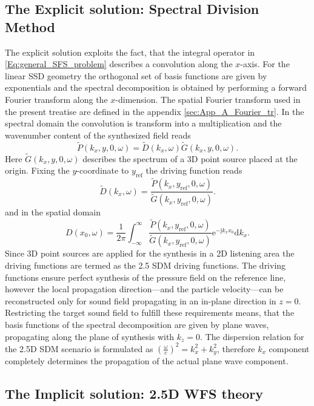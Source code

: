 \documentclass[journal]{IEEEtran}
\newcommand{\td}{\mathrm{d}}
\newcommand{\te}{\mathrm{e}}
\newcommand{\ti}{\mathrm{j}}
\newcommand{\yref}{y_{\mathrm{ref}}}
\begin{document}
\subsection{The Explicit solution: Spectral Division Method}

The explicit solution exploits the fact, that the integral operator in \eqref{Eq:general_SFS_problem} describes a convolution along the $x$-axis. 
For the linear SSD geometry the orthogonal set of basis functions are given by exponentials and the spectral decomposition is obtained by performing a forward Fourier transform along the $x$-dimension.
The spatial Fourier transform used in the present treatise are defined in the appendix \ref{sec:App_A_Fourier_tr}. 
In the spectral domain the convolution is transform into a multiplication and the wavenumber content of the synthesized field reads
\begin{equation}
\tilde{P}(k_x, y, 0, \omega) = \tilde{D}(k_x, \omega) \tilde{G}(k_x, y, 0,\omega).
\end{equation}
Here $\tilde{G}(k_x,y,0,\omega)$ describes the spectrum of a 3D point source placed at the origin.
Fixing the $y$-coordinate to $\yref$ the driving function reads
\begin{equation}
\tilde{D}(k_x,\omega) = \frac{\tilde{P}(k_x, \yref, 0, \omega)}{\tilde{G}(k_x, \yref, 0,\omega)}.
\end{equation}
and in the spatial domain
\begin{equation}
D(x_0,\omega) = \frac{1}{2\pi} \int_{-\infty}^{\infty} \frac{\tilde{P}(k_x, \yref, 0, \omega)}{\tilde{G}(k_x, \yref, 0,\omega)} \te^{- \ti k_x x_0} \td k_x.
\end{equation}
Since 3D point sources are applied for the synthesis in a 2D listening area the driving functions are termed as the 2.5 SDM driving functions.
The driving functions ensure perfect synthesis of the pressure field on the reference line, however the local propagation direction---and the particle velocity---can be reconstructed only for sound field propagating in an in-plane direction in $z=0$.
Restricting the target sound field to fulfill these requirements means, that the basis functions of the spectral decomposition are given by plane waves, propagating along the plane of synthesis with $k_z = 0$. 
The dispersion relation for the 2.5D SDM scenario is formulated as $\left( \frac{\omega}{c} \right)^2 = k_x^2 + k_y^2$, therefore $k_x$ component completely determines the propagation of the actual plane wave component.

\subsection{The Implicit solution: 2.5D WFS theory}
\end{document}
